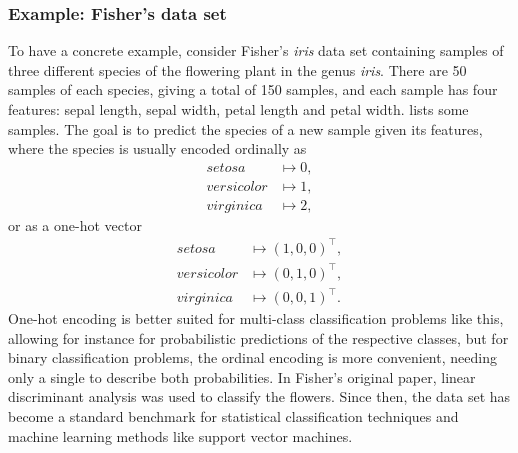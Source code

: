 \subsubsection{Example: Fisher's  data set}
\label{sec:iris}
To have a concrete example, consider Fisher's \textit{iris} data set \cite{fisher1936} containing samples of three different species of the flowering plant in the genus \textit{iris}.
There are 50 samples of each species, giving a total of 150 samples, and each sample has four features: sepal length, sepal width, petal length and petal width.
 lists some samples.
The goal is to predict the species of a new sample given its features, where the species is usually encoded ordinally as
\begin{equation}
    \label{eq:iris_encoding}
    \begin{split}
        \textit{setosa} &\mapsto 0,\\
        \textit{versicolor} &\mapsto 1,\\
        \textit{virginica} &\mapsto 2,
    \end{split}
\end{equation}
or as a one-hot vector
\begin{equation}
    \label{eq:iris_one_hot}
    \begin{split}
        \textit{setosa} &\mapsto (1, 0, 0)^\top,\\
        \textit{versicolor} &\mapsto (0, 1, 0)^\top,\\
        \textit{virginica} &\mapsto (0, 0, 1)^\top.
    \end{split}
\end{equation}
One-hot encoding is better suited for multi-class classification problems like this, allowing for instance for probabilistic predictions of the respective classes, but for binary classification problems, the ordinal encoding is more convenient, needing only a single to describe both probabilities.
In Fisher's original paper, linear discriminant analysis was used to classify the flowers.
Since then, the data set has become a standard benchmark for statistical classification techniques and machine learning methods like support vector machines.


